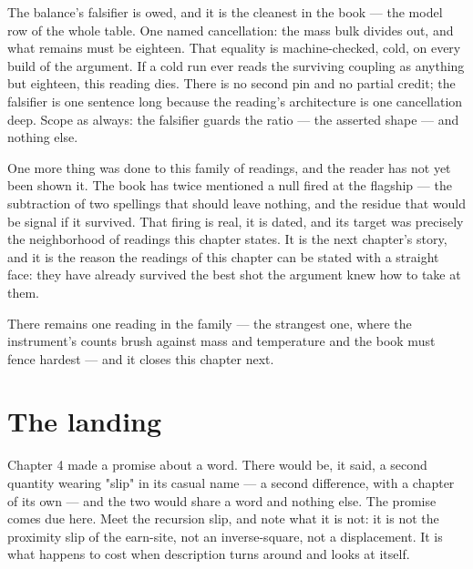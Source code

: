 The balance's falsifier is owed, and it is the cleanest in the book --- the model
row of the whole table. One named cancellation: the mass bulk divides out, and what
remains must be eighteen. That equality is machine-checked, cold, on every build of
the argument. If a cold run ever reads the surviving coupling as anything but
eighteen, this reading dies. There is no second pin and no partial credit; the
falsifier is one sentence long because the reading's architecture is one
cancellation deep. Scope as always: the falsifier guards the ratio --- the
asserted shape --- and nothing else.

One more thing was done to this family of readings, and the reader has not yet
been shown it. The book has twice mentioned a null fired at the flagship --- the
subtraction of two spellings that should leave nothing, and the residue that would
be signal if it survived. That firing is real, it is dated, and its target was
precisely the neighborhood of readings this chapter states. It is the next
chapter's story, and it is the reason the readings of this chapter can be stated
with a straight face: they have already survived the best shot the argument knew
how to take at them.

There remains one reading in the family --- the strangest one, where the
instrument's counts brush against mass and temperature and the book must fence
hardest --- and it closes this chapter next.

\section{The landing}

Chapter 4 made a promise about a word. There would be, it said, a second quantity
wearing "slip" in its casual name --- a second difference, with a chapter of its own
--- and the two would share a word and nothing else. The promise comes due here. Meet
the recursion slip, and note what it is not: it is not the proximity slip of the
earn-site, not an inverse-square, not a displacement. It is what happens to cost when
description turns around and looks at itself.

